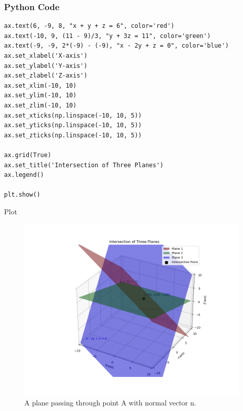 \documentclass{beamer}
\begin{document}
\begin{frame}[fragile]
    \frametitle{Python Code}
    \begin{lstlisting}
ax.text(6, -9, 8, "x + y + z = 6", color='red')
ax.text(-10, 9, (11 - 9)/3, "y + 3z = 11", color='green')
ax.text(-9, -9, 2*(-9) - (-9), "x - 2y + z = 0", color='blue')
ax.set_xlabel('X-axis')
ax.set_ylabel('Y-axis')
ax.set_zlabel('Z-axis')
ax.set_xlim(-10, 10)
ax.set_ylim(-10, 10)
ax.set_zlim(-10, 10)
ax.set_xticks(np.linspace(-10, 10, 5))
ax.set_yticks(np.linspace(-10, 10, 5))
ax.set_zticks(np.linspace(-10, 10, 5))

ax.grid(True)
ax.set_title('Intersection of Three Planes')
ax.legend()

plt.show()
    \end{lstlisting}
\end{frame}

\begin{frame}{Plot}
\begin{figure}[h!]
\begin{center}
\includegraphics[width=\columnwidth]{figs/fig.png}
\end{center}
\caption{A plane passing through point A with normal vector n.}
\label{fig:Fig.1}
\end{figure}
  
\end{frame}
\end{document}

